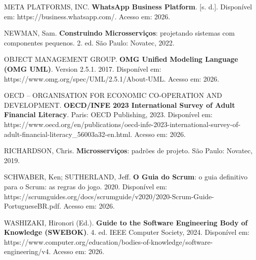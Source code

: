 \begin{sloppypar}
META PLATFORMS, INC. \textbf{WhatsApp Business Platform}. [s. d.]. Disponível em: https://business.whatsapp.com/. Acesso em: 2026.

\vspace{0.4cm}

NEWMAN, Sam. \textbf{Construindo Microsserviços}: projetando sistemas com componentes pequenos. 2. ed. São Paulo: Novatec, 2022.

\vspace{0.4cm}

OBJECT MANAGEMENT GROUP. \textbf{OMG Unified Modeling Language (OMG UML)}. Version 2.5.1. 2017. Disponível em: https://www.omg.org/spec/UML/2.5.1/About-UML. Acesso em: 2026.

\vspace{0.4cm}

OECD -- ORGANISATION FOR ECONOMIC CO-OPERATION AND DEVELOPMENT. \textbf{OECD/INFE 2023 International Survey of Adult Financial Literacy}. Paris: OECD Publishing, 2023. Disponível em: https://www.oecd.org/en/publications/oecd-infe-2023-international-survey-of-adult-financial-literacy\_56003a32-en.html. Acesso em: 2026.

\vspace{0.4cm}

RICHARDSON, Chris. \textbf{Microsserviços}: padrões de projeto. São Paulo: Novatec, 2019.

\vspace{0.4cm}

SCHWABER, Ken; SUTHERLAND, Jeff. \textbf{O Guia do Scrum}: o guia definitivo para o Scrum: as regras do jogo. 2020. Disponível em: https://scrumguides.org/docs/scrumguide/v2020/2020-Scrum-Guide-PortugueseBR.pdf. Acesso em: 2026.

\vspace{0.4cm}

WASHIZAKI, Hironori (Ed.). \textbf{Guide to the Software Engineering Body of Knowledge (SWEBOK)}. 4. ed. IEEE Computer Society, 2024. Disponível em: https://www.computer.org/education/bodies-of-knowledge/software-engineering/v4. Acesso em: 2026.

\end{sloppypar}
